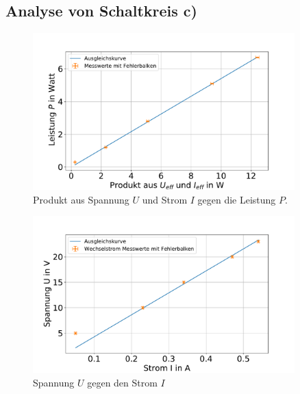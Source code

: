 \subsection{Analyse von Schaltkreis c)}


\begin{figure}[h]
	\centering
	\includegraphics[width=0.9\textwidth]{res/PgegenUIK.pdf}
	\caption{Produkt aus Spannung $U$ und Strom $I$ gegen die Leistung $P$.}
	\label{fig:PgegenUIK}
\end{figure}


\begin{figure}[h]
	\centering
	\includegraphics[width=0.9\textwidth]{res/UgegenIK.pdf}
	\caption{Spannung $U$ gegen den Strom $I$}
	\label{fig:UgegenIK}
\end{figure}


